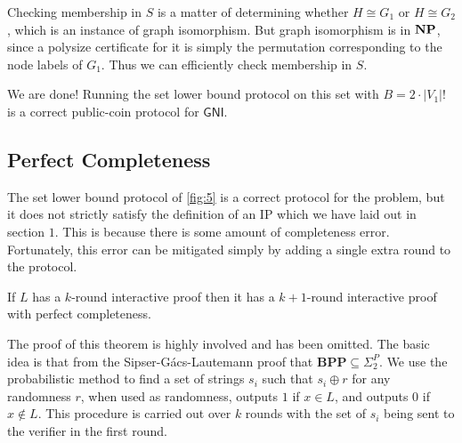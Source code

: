 Checking membership in $S$ is a matter of determining whether $H\cong G_1$ or $H\cong G_2$, which is an instance of graph isomorphism. But graph isomorphism is in $\mathbf{NP}$, since a polysize certificate for it is simply the permutation corresponding to the node labels of $G_1$. Thus we can efficiently check membership in $S$.

We are done! Running the set lower bound protocol on this set with $B=2\cdot|V_1|!$ is a correct public-coin protocol for $\mathsf{GNI}$.

\subsection{Perfect Completeness}

The set lower bound protocol of \ref{fig:5} is a correct protocol for the problem, but it does not strictly satisfy the definition of an IP which we have laid out in section $1$. This is because there is some amount of completeness error. Fortunately, this error can be mitigated simply by adding a single extra round to the protocol.

\begin{theorem}
	If $L$ has a $k$-round interactive proof then it has a $k+1$-round interactive proof with perfect completeness.
\end{theorem}

The proof of this theorem is highly involved and has been omitted. The basic idea is that from the Sipser-G\'acs-Lautemann \cite{LAUTEMANN1983215} proof that $\mathbf{BPP}\subseteq\Sigma_2^P$. We use the probabilistic method to find a set of strings $s_i$ such that $s_i\oplus r$ for any randomness $r$, when used as randomness, outputs $1$ if $x\in L$, and outputs $0$ if $x\notin L$. This procedure is carried out over $k$ rounds with the set of $s_i$ being sent to the verifier in the first round.
